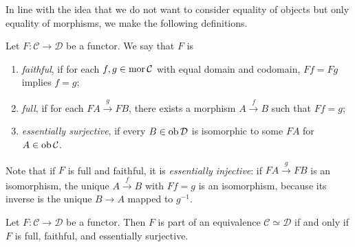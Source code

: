 In line with the idea that we do not want to consider equality of objects but only equality of morphisms, we make the following definitions.
\begin{definition}
    Let \( F : \mathcal C \to \mathcal D \) be a functor.
    We say that \( F \) is
    \begin{enumerate}
        \item \emph{faithful}, if for each \( f, g \in \operatorname{mor} \mathcal C \) with equal domain and codomain, \( Ff = Fg \) implies \( f = g \);
        \item \emph{full}, if for each \( FA \xrightarrow g FB \), there exists a morphism \( A \xrightarrow f B \) such that \( Ff = g \);
        \item \emph{essentially surjective}, if every \( B \in \operatorname{ob} \mathcal D \) is isomorphic to some \( FA \) for \( A \in \operatorname{ob} \mathcal C \).
    \end{enumerate}
\end{definition}
Note that if \( F \) is full and faithful, it is \emph{essentially injective}: if \( FA \xrightarrow g FB \) is an isomorphism, the unique \( A \xrightarrow f B \) with \( Ff = g \) is an isomorphism, because its inverse is the unique \( B \to A \) mapped to \( g^{-1} \).
\begin{lemma}
    Let \( F : \mathcal C \to \mathcal D \) be a functor.
    Then \( F \) is part of an equivalence \( \mathcal C \simeq \mathcal D \) if and only if \( F \) is full, faithful, and essentially surjective.
\end{lemma}

